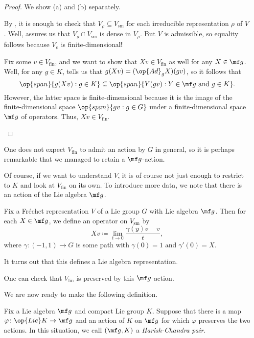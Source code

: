 \documentclass[../notes.tex]{subfiles}
\begin{document}
\begin{proof}
	We show (a) and (b) separately.
	\begin{listalph}
		\item By , it is enough to check that $V_\rho\subseteq V_{\mathrm{sm}}$ for each irreducible representation $\rho$ of $V$. Well,  assures us that $V_\rho\cap V_{\mathrm{sm}}$ is dense in $V_\rho$. But $V$ is admissible, so equality follows because $V_\rho$ is finite-dimensional!
		\item Fix some $v\in V_{\mathrm{fin}}$, and we want to show that $Xv\in V_{\mathrm{fin}}$ as well for any $X\in\mf g$. Well, for any $g\in K$,  tells us that $g(Xv)=(\op{Ad}_gX)(gv)$, so it follows that
		\[\op{span}\{g(Xv):g\in K\}\subseteq\op{span}\{Y(gv):Y\in\mf g\text{ and }g\in K\}.\]
		However, the latter space is finite-dimensional because it is the image of the finite-dimensional space $\op{span}\{gv:g\in G\}$ under a finite-dimensional space $\mf g$ of operators. Thus, $Xv\in V_{\mathrm{fin}}$.
		\qedhere
	\end{listalph}
\end{proof}
\begin{remark}
	One does not expect $V_{\mathrm{fin}}$ to admit an action by $G$ in general, so it is perhaps remarkable that we managed to retain a $\mf g$-action.
\end{remark}
Of course, if we want to understand $V$, it is of course not just enough to restrict to $K$ and look at $V_{\mathrm{fin}}$ on its own. To introduce more data, we note that there is an action of the Lie algebra $\mf g$.
\begin{notation}
	Fix a Fr\'echet representation $V$ of a Lie group $G$ with Lie algebra $\mf g$. Then for each $X\in\mf g$, we define an operator on $V_{\mathrm{sm}}$ by
	\[Xv\coloneqq\lim_{t\to0}\frac{\gamma(y)v-v}t,\]
	where $\gamma\colon(-1,1)\to G$ is some path with $\gamma(0)=1$ and $\gamma'(0)=X$.
\end{notation}
\begin{remark}
	It turns out that this defines a Lie algebra representation.
\end{remark}
\begin{remark}
	One can check that $V_{\mathrm{fin}}$ is preserved by this $\mf g$-action.
\end{remark}
We are now ready to make the following definition.
\begin{definition}
	Fix a Lie algebra $\mf g$ and compact Lie group $K$. Suppose that there is a map $\varphi\colon\op{Lie}K\to\mf g$ and an action of $K$ on $\mf g$ for which $\varphi$ preserves the two actions. In this situation, we call $(\mf g,K)$ a \textit{Harish-Chandra pair}.
\end{definition}
\end{document}
